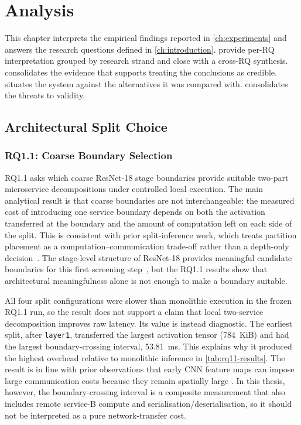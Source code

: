 \chapter{Analysis}%
\label{ch:analysis}

This chapter interprets the empirical findings reported in
\cref{ch:experiments} and answers the research questions defined in
\cref{ch:introduction}.  provide per-RQ interpretation grouped by research
strand and close with a cross-RQ synthesis. 
consolidates the evidence that supports treating the conclusions as credible.
 situates the system against the alternatives it
was compared with.  consolidates the threats to
validity.

\section{Architectural Split Choice}
\label{sec:analysis-split}

\subsection{RQ1.1: Coarse Boundary Selection}
\label{sec:analysis-rq11}

RQ1.1 asks which coarse ResNet-18 stage boundaries provide suitable
two-part microservice decompositions under controlled local execution. The
main analytical result is that coarse boundaries are not interchangeable:
the measured cost of introducing one service boundary depends on both the
activation transferred at the boundary and the amount of computation left
on each side of the split. This is consistent with prior split-inference
work, which treats partition placement as a computation--communication
trade-off rather than a depth-only decision~\cite{neurosurgeon,dnnsplit}.
The stage-level structure of ResNet-18 provides meaningful candidate
boundaries for this first screening step~\cite{resnet}, but the RQ1.1
results show that architectural meaningfulness alone is not enough to make
a boundary suitable.

All four split configurations were slower than monolithic execution in the
frozen RQ1.1 run, so the result does not support a claim that local
two-service decomposition improves raw latency. Its value is instead
diagnostic. The earliest split, after \texttt{layer1}, transferred the
largest activation tensor (784~KiB) and had the largest boundary-crossing
interval, 53.81~ms. This explains why it produced the highest overhead
relative to monolithic inference in \cref{tab:rq11-results}. The result is
in line with prior observations that early CNN feature maps can impose
large communication costs because they remain spatially large
\cite{deeperthings,neurosurgeon}. In this thesis, however, the
boundary-crossing interval is a composite measurement that also includes
remote service-B compute and serialisation/deserialisation, so it should
not be interpreted as a pure network-transfer cost.

